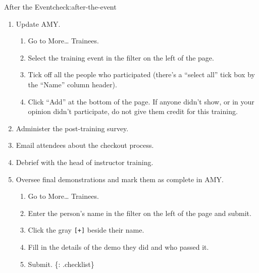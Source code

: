 \begin{checklist}{After the Event}{check:after-the-event}

\begin{enumerate}
\item
  Update AMY.

  \begin{enumerate}
    \item
    Go to More\ldots{} Trainees.
  \item
    Select the training event in the filter on the left of the page.
  \item
    Tick off all the people who participated (there's a ``select all''
    tick box by the ``Name'' column header).
  \item
    Click ``Add'' at the bottom of the page. If anyone didn't show, or
    in your opinion didn't participate, do not give them credit for this
    training.
  \end{enumerate}
\item
  Administer the post-training survey.
\item
  Email attendees about
  the checkout process.
\item
  Debrief with the head of instructor training.
\item
  Oversee final demonstrations and mark them as complete in AMY.

  \begin{enumerate}
    \item
    Go to More\ldots{} Trainees.
  \item
    Enter the person's name in the filter on the left of the page and
    submit.
  \item
    Click the gray \texttt{{[}+{]}} beside their name.
  \item
    Fill in the details of the demo they did and who passed it.
  \item
    Submit. \{: .checklist\}
  \end{enumerate}
\end{enumerate}
\end{checklist}

